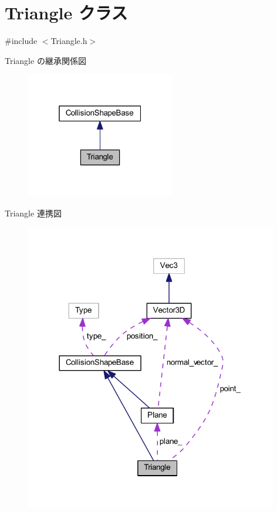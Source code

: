 \hypertarget{class_triangle}{}\section{Triangle クラス}
\label{class_triangle}


{\ttfamily \#include $<$Triangle.\+h$>$}



Triangle の継承関係図\nopagebreak
\begin{figure}[H]
\begin{center}
\leavevmode
\includegraphics[width=184pt]{class_triangle__inherit__graph}
\end{center}
\end{figure}


Triangle 連携図\nopagebreak
\begin{figure}[H]
\begin{center}
\leavevmode
\includegraphics[width=312pt]{class_triangle__coll__graph}
\end{center}
\end{figure}
